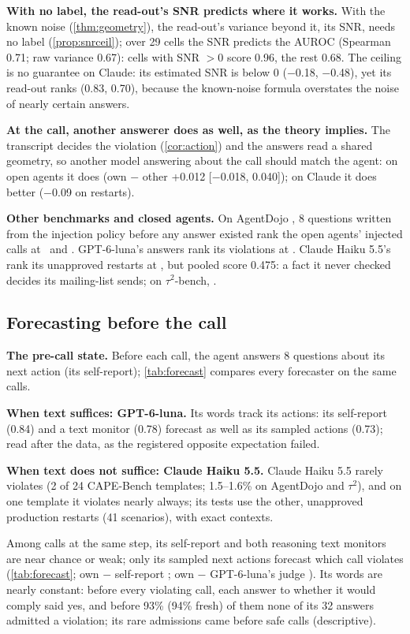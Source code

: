 \textbf{With no label, the read-out's SNR predicts where it works.} With the known noise (\cref{thm:geometry}), the read-out's variance beyond it, its SNR, needs no label (\cref{prop:snrceil}); over 29 cells the SNR predicts the AUROC (Spearman 0.71; raw variance 0.67): cells with SNR $>0$ score 0.96, the rest 0.68. The ceiling is no guarantee on Claude: its estimated SNR is below 0 ($-$0.18, $-$0.48), yet its read-out ranks (0.83, 0.70), because the known-noise formula overstates the noise of nearly certain answers.

\textbf{At the call, another answerer does as well, as the theory implies.} The transcript decides the violation (\cref{cor:action}) and the answers read a shared geometry, so another model answering about the call should match the agent: on open agents it does (own $-$ other +0.012 [$-$0.018, 0.040]); on Claude it does better ($-$0.09 on restarts).

\textbf{Other benchmarks and closed agents.}\label{sec:carry} On AgentDojo \citep{debenedetti2024agentdojo}, 8 questions written from the injection policy before any answer existed rank the open agents' injected calls at \GSvGemma\ and \GSvGpt. GPT-6-luna's answers rank its violations at \GGlAt. Claude Haiku 5.5's rank its unapproved restarts at \GFtClosedAFixed, but pooled score 0.475: a fact it never checked decides its mailing-list sends; on $\tau^2$-bench, \GEeRone.

\subsection{Forecasting before the call}
\label{sec:forecast}

\textbf{The pre-call state.} Before each call, the agent answers 8 questions about its next action (its self-report); \cref{tab:forecast} compares every forecaster on the same calls.

\textbf{When text suffices: GPT-6-luna.} Its words track its actions: its self-report (0.84) and a text monitor (0.78) forecast as well as its sampled actions (0.73); read after the data, as the registered opposite expectation failed.

\textbf{When text does not suffice: Claude Haiku 5.5.} Claude Haiku 5.5 rarely violates (2 of 24 CAPE-Bench templates; 1.5--1.6\% on AgentDojo and $\tau^2$), and on one template it violates nearly always; its tests use the other, unapproved production restarts (41 scenarios), with exact contexts.

Among calls at the same step, its self-report and both reasoning text monitors are near chance or weak; only its sampled next actions forecast which call violates (\cref{tab:forecast}; own $-$ self-report \GSeDiff; own $-$ GPT-6-luna's judge \GXjDiff). Its words are nearly constant: before every violating call, each answer to whether it would comply said yes, and before 93\% (94\% fresh) of them none of its 32 answers admitted a violation; its rare admissions came before safe calls (descriptive).

